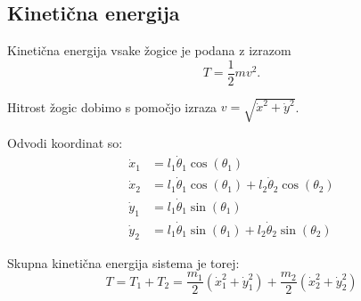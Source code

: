 \documentclass[a4paper,11pt]{article}
\begin{document}
\subsection*{Kinetična energija}

Kinetična energija vsake žogice je podana z izrazom $$T = \frac{1}{2} m v^2.$$

Hitrost žogic dobimo s pomočjo izraza $v = \sqrt{\dot{x}^2 + \dot{y}^2}$.

Odvodi koordinat so: \begin{align*}
\dot{x}_1 &= l_1 \dot{\theta}_1 \cos(\theta_1) \\
\dot{x}_2 &= l_1 \dot{\theta}_1 \cos(\theta_1) + l_2 \dot{\theta}_2 \cos(\theta_2) \\
\dot{y}_1 &= l_1 \dot{\theta}_1 \sin(\theta_1) \\
\dot{y}_2 &= l_1 \dot{\theta}_1 \sin(\theta_1) + l_2 \dot{\theta}_2 \sin(\theta_2)
\end{align*}

Skupna kinetična energija sistema je torej:
$$T = T_1 + T_2 = \frac{m_1}{2}(\dot{x}_1^2 + \dot{y}_1^2) + \frac{m_2}{2}(\dot{x}_2^2 + \dot{y}_2^2)$$
\end{document}
